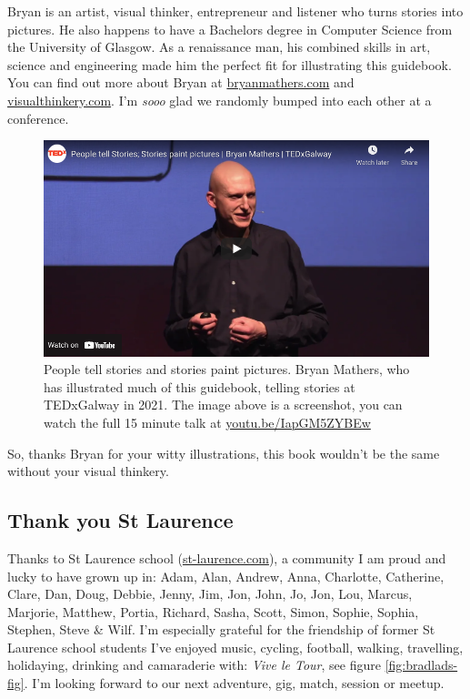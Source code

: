 \documentclass[
]{book}
\begin{document}
Bryan is an artist, visual thinker, entrepreneur and listener who turns stories into pictures. He also happens to have a Bachelors degree in Computer Science from the University of Glasgow. As a renaissance man, his combined skills in art, science and engineering made him the perfect fit for illustrating this guidebook. You can find out more about Bryan at \href{https://bryanmmathers.com}{bryanmathers.com} and \href{https://visualthinkery.com}{visualthinkery.com}. I'm \emph{sooo} glad we randomly bumped into each other at a conference.

\begin{figure}

{\centering \includegraphics[width=1\linewidth]{images/bryan-mathers-tedx-galway} 

}

\caption{People tell stories and stories paint pictures. Bryan Mathers, who has illustrated much of this guidebook, telling stories at TEDxGalway in 2021. The image above is a screenshot, you can watch the full 15 minute talk at \href{https://youtu.be/IapGM5ZYBEw}{youtu.be/IapGM5ZYBEw}}\label{fig:tedx-galway-fig}
\end{figure}



So, thanks Bryan for your witty illustrations, this book wouldn't be the same without your visual thinkery. 🙏

\hypertarget{st-laurence}{%
\subsection{Thank you St Laurence}\label{st-laurence}}

Thanks to St Laurence school (\href{https://st-laurence.com/}{st-laurence.com}), a community I am proud and lucky to have grown up in: Adam, Alan, Andrew, Anna, Charlotte, Catherine, Clare, Dan, Doug, Debbie, Jenny, Jim, Jon, John, Jo, Jon, Lou, Marcus, Marjorie, Matthew, Portia, Richard, Sasha, Scott, Simon, Sophie, Sophia, Stephen, Steve \& Wilf. I'm especially grateful for the friendship of former St Laurence school students I've enjoyed music, cycling, football, walking, travelling, holidaying, drinking and camaraderie with: \emph{Vive le Tour}, see figure \ref{fig:bradlads-fig}. I'm looking forward to our next adventure, gig, match, session or meetup.
\end{document}
